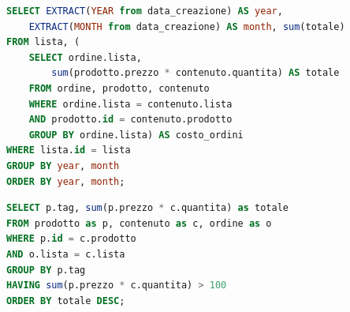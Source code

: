\documentclass[11pt]{article}
\begin{document}
\begin{lstlisting}[language=SQL]
SELECT EXTRACT(YEAR from data_creazione) AS year, 
	EXTRACT(MONTH from data_creazione) AS month, sum(totale)
FROM lista, (
	SELECT ordine.lista, 
		sum(prodotto.prezzo * contenuto.quantita) AS totale
	FROM ordine, prodotto, contenuto
	WHERE ordine.lista = contenuto.lista
	AND prodotto.id = contenuto.prodotto
	GROUP BY ordine.lista) AS costo_ordini
WHERE lista.id = lista
GROUP BY year, month
ORDER BY year, month;
\end{lstlisting}





\begin{lstlisting}[language=SQL]
SELECT p.tag, sum(p.prezzo * c.quantita) as totale
FROM prodotto as p, contenuto as c, ordine as o
WHERE p.id = c.prodotto
AND o.lista = c.lista
GROUP BY p.tag
HAVING sum(p.prezzo * c.quantita) > 100
ORDER BY totale DESC;
\end{lstlisting}
\end{document}

